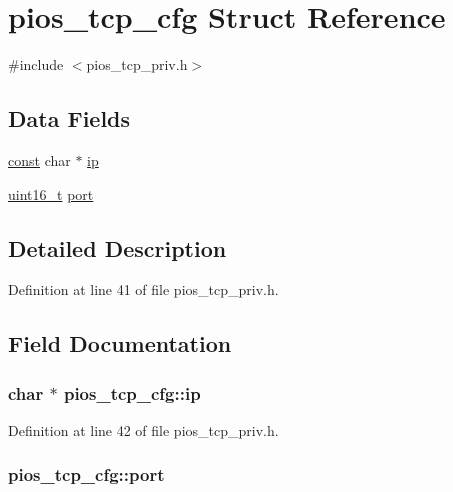 \hypertarget{structpios__tcp__cfg}{\section{pios\-\_\-tcp\-\_\-cfg Struct Reference}
\label{structpios__tcp__cfg}
}


{\ttfamily \#include $<$pios\-\_\-tcp\-\_\-priv.\-h$>$}

\subsection*{Data Fields}
\begin{DoxyCompactItemize}
\item 
\hyperlink{group___n_a_m_e_ga7ae6d0e43244213b34de2c2b9aa30da6}{const} char $\ast$ \hyperlink{structpios__tcp__cfg_a83893aa36dac19076c911d3b0531f7cb}{ip}
\item 
\hyperlink{stdint_8h_a273cf69d639a59973b6019625df33e30}{uint16\-\_\-t} \hyperlink{structpios__tcp__cfg_a23004e4175e28dd6a53db5545026bede}{port}
\end{DoxyCompactItemize}


\subsection{Detailed Description}


Definition at line 41 of file pios\-\_\-tcp\-\_\-priv.\-h.



\subsection{Field Documentation}
\hypertarget{structpios__tcp__cfg_a83893aa36dac19076c911d3b0531f7cb}{
\subsubsection[{ip}]{ char $\ast$ pios\-\_\-tcp\-\_\-cfg\-::ip}}\label{structpios__tcp__cfg_a83893aa36dac19076c911d3b0531f7cb}


Definition at line 42 of file pios\-\_\-tcp\-\_\-priv.\-h.

\hypertarget{structpios__tcp__cfg_a23004e4175e28dd6a53db5545026bede}{
\subsubsection[{port}]{ pios\-\_\-tcp\-\_\-cfg\-::port}}\label{structpios__tcp__cfg_a23004e4175e28dd6a53db5545026bede}


